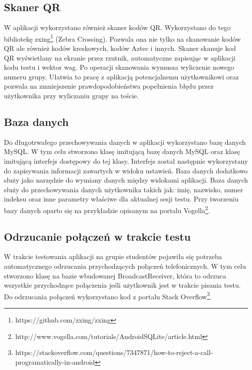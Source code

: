 \documentclass[eng]{mgr}
\begin{document}
			\subsection{Skaner QR}
			
			W aplikacji wykorzystano również skaner kodów QR. Wykorzystano do tego bibliotekę zxing\footnote{https://github.com/zxing/zxing} (Zebra Crossing). Pozwala ona nie tylko na skanowanie kodów QR ale również kodów kreskowych, kodów Aztec i innych. Skaner skanuje kod QR wyświetlany na ekranie przez rzutnik, automatyczne zapisując w aplikacji kodu testu i wektor wag. Po operacji skanowania wymusza wyliczenie nowego numeru grupy. Ułatwia to pracę z aplikacją potencjalnemu użytkownikowi oraz pozwala na zmniejszenie prawdopodobieństwa popełnienia błędu przez użytkownika przy wyliczaniu grupy na teście.
			
			\subsection{Baza danych}
			
			Do długotrwałego przechowywania danych w aplikacji wykorzystano bazę danych MySQL. W tym celu stworzono klasę imitującą bazę danych MySQL oraz klasę imitującą interfejs dostępowy do tej klasy. Interfejs został następnie wykorzystany do zapisywania informacji zawartych w widoku ustawień. Baza danych dodatkowo służy jako narzędzie do wymiany danych między widokami aplikacji. Baza danych służy do przechowywania danych użytkownika takich jak: imię, nazwisko, numer indeksu oraz inne parametry właściwe dla aktualnej sesji testu. Przy tworzeniu bazy danych oparto się na przykładzie opisanym na portalu Vogella\footnote{http://www.vogella.com/tutorials/AndroidSQLite/article.html}.
			
			\subsection{Odrzucanie połączeń w trakcie testu}
			
			W trakcie testowania aplikacji na grupie studentów pojawiła się potrzeba automatycznego odrzucania przychodzących połączeń telefonicznych. W tym celu stworzono klasę na bazie wbudowanej BroadcastReceiver, która to odrzuca wszystkie przychodzące połączenia jeśli użytkownik jest w trakcie pisania testu. Do odrzucania połączeń wykorzystano kod z portalu Stack Overflow\footnote{https://stackoverflow.com/questions/7347871/how-to-reject-a-call-programatically-in-android}.
			
\end{document}
